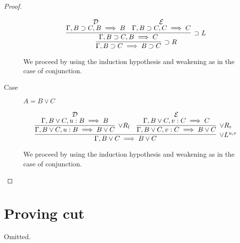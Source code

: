 \documentclass[11pt,letterpaper]{article}
\newcommand{\seq}{\implies}
\newcommand{\imp}{\supset}
\begin{document}
\begin{proof}
\begin{description}
            \begin{equation*}
                \infer[\imp R]{\Gamma, B \imp C \seq B \imp C}{
                    \infer[\imp L]{\Gamma, B \imp C, B \seq C}{
                        \deduce[\mathcal{D}]{\Gamma, B \imp C, B \seq B}{}
                        &
                        \deduce[\mathcal{E}]{\Gamma, B \imp C, C \seq C}{}
                    }
                }
            \end{equation*}

            We proceed by using the induction hypothesis and weakening as in
            the case of conjunction.

        \item[Case] $A = B \lor C$

            \begin{equation*}
                \infer[\lor L^{u, v}]{\Gamma, B \lor C \seq B \lor C}{
                    \infer[\lor R_l]{\Gamma, B \lor C, u:B \seq B \lor C}{
                        \deduce[\mathcal{D}]{\Gamma, B \lor C, u:B \seq B}{}
                    }
                    &
                    \infer[\lor R_r]{\Gamma, B \lor C, v:C \seq B \lor C}{
                        \deduce[\mathcal{E}]{\Gamma, B \lor C, v:C \seq C}{}
                    }
                }
            \end{equation*}

            We proceed by using the induction hypothesis and weakening as in
            the case of conjunction.

    \end{description}
\end{proof}

\section{Proving cut}

Omitted.
\end{document}
